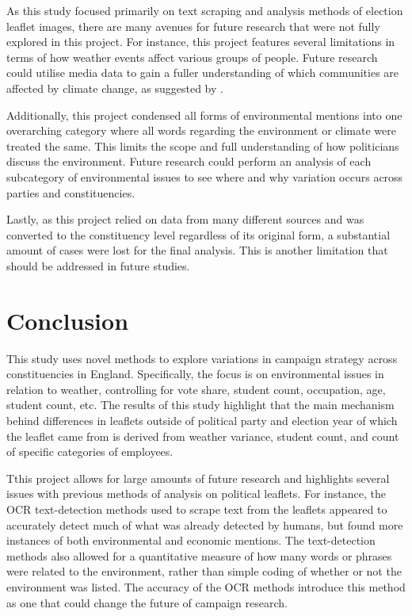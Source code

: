 \documentclass[12pt,letterpaper]{article}
\begin{document}
As this study focused primarily on text scraping and analysis methods of election leaflet images, there are many avenues for future research that were not fully explored in this project. For instance, this project features several limitations in terms of how weather events affect various groups of people. Future research could utilise media data to gain a fuller understanding of which communities are affected by climate change, as suggested by \textcite{siscoEffectsWeatherExperiences2021}. 

Additionally, this project condensed all forms of environmental mentions into one overarching category where all words regarding the environment or climate were treated the same. This limits the scope and full understanding of how politicians discuss the environment. Future research could perform an analysis of each subcategory of environmental issues to see where and why variation occurs across parties and constituencies.

Lastly, as this project relied on data from many different sources and was converted to the constituency level regardless of its original form, a substantial amount of cases were lost for the final analysis. This is another limitation that should be addressed in future studies.
	

\section{Conclusion}

This study uses novel methods to explore variations in campaign strategy across constituencies in England. Specifically, the focus is on environmental issues in relation to weather, controlling for vote share, student count, occupation, age, student count, etc. The results of this study highlight that the main mechanism behind differences in leaflets outside of political party and election year of which the leaflet came from is derived from weather variance, student count, and count of specific categories of employees.  


Tthis project allows for large amounts of future research and highlights several issues with previous methods of analysis on political leaflets. For instance, the OCR text-detection methods used to scrape text from the leaflets appeared to accurately detect much of what was already detected by humans, but found more instances of both environmental and economic mentions. The text-detection methods also allowed for a quantitative measure of how many words or phrases were related to the environment, rather than simple coding of whether or not the environment was listed. The accuracy of the OCR methods introduce this method as one that could change the future of campaign research.
\end{document}
